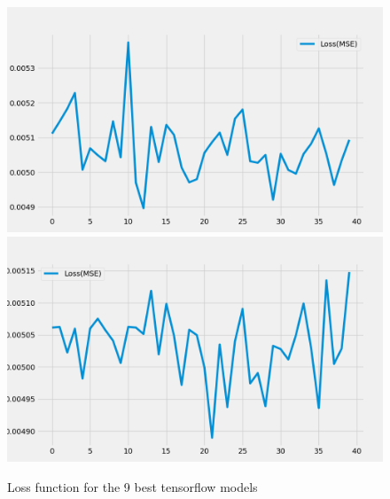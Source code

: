 \begin{figure}[H]
    \includegraphics[width=.30\textwidth]{../data/Figures/Neural networks/ForLoop_Tensor/plotLoss_52.png}\hfill
    \includegraphics[width=.30\textwidth]{../data/Figures/Neural networks/ForLoop_Tensor/plotLoss_268.png}\hfill
    \caption{Loss function for the 9 best tensorflow models}\label{fig:tensorflow preds loss}
\end{figure}
